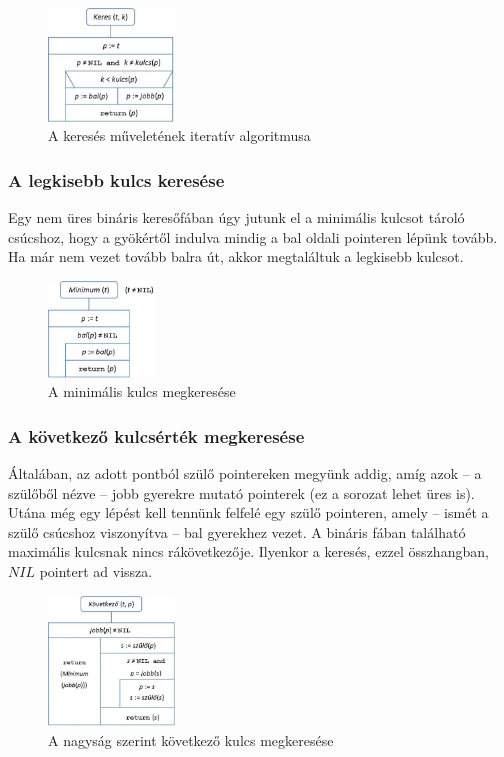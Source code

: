 \documentclass[12pt,margin=0px]{article}
\begin{document}
	\begin{figure}[H]
		\centering
        \includegraphics[width=0.3\textwidth]{img/bin_tree_iterative.png}
		\caption{A keresés műveletének iteratív algoritmusa}
	\end{figure}

    \subsubsection*{A legkisebb kulcs keresése}

    \noindent Egy nem üres bináris keresőfában úgy jutunk el a minimális kulcsot tároló csúcshoz, hogy a gyökértől indulva mindig a bal oldali pointeren lépünk tovább. Ha már nem vezet tovább balra út, akkor megtaláltuk a legkisebb kulcsot.
	\begin{figure}[H]
		\centering
        \includegraphics[width=0.25\textwidth]{img/btree_min.png}
		\caption{A minimális kulcs megkeresése}
	\end{figure}

    \subsubsection*{A következő kulcsérték megkeresése}

    \noindent Általában, az adott pontból szülő pointereken megyünk addig, amíg azok – a szülőből nézve – jobb gyerekre mutató pointerek (ez a sorozat lehet üres is). Utána még egy lépést kell tennünk felfelé egy szülő pointeren, amely – ismét a szülő csúcshoz viszonyítva – bal gyerekhez vezet. A bináris fában található maximális kulcsnak nincs rákövetkezője. Ilyenkor a keresés, ezzel összhangban, $NIL$ pointert ad vissza.

	\begin{figure}[H]
		\centering
		\includegraphics[width=0.30\textwidth]{img/btree_next.png}
		\caption{A nagyság szerint következő kulcs megkeresése}
	\end{figure}
\end{document}
